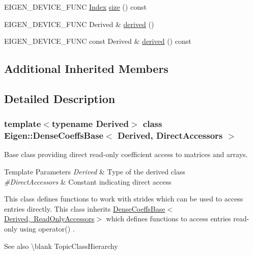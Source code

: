 \begin{DoxyCompactItemize}
\item 
E\+I\+G\+E\+N\+\_\+\+D\+E\+V\+I\+C\+E\+\_\+\+F\+U\+NC \mbox{\hyperlink{struct_eigen_1_1_eigen_base_a554f30542cc2316add4b1ea0a492ff02}{Index}} \mbox{\hyperlink{class_eigen_1_1_dense_coeffs_base_3_01_derived_00_01_direct_accessors_01_4_ac2c9348df3bb9c0044dbae6c278a8977}{size}} () const
\item 
E\+I\+G\+E\+N\+\_\+\+D\+E\+V\+I\+C\+E\+\_\+\+F\+U\+NC Derived \& \mbox{\hyperlink{class_eigen_1_1_dense_coeffs_base_3_01_derived_00_01_direct_accessors_01_4_a324b16961a11d2ecfd2d1b7dd7946545}{derived}} ()
\item 
E\+I\+G\+E\+N\+\_\+\+D\+E\+V\+I\+C\+E\+\_\+\+F\+U\+NC const Derived \& \mbox{\hyperlink{class_eigen_1_1_dense_coeffs_base_3_01_derived_00_01_direct_accessors_01_4_ad0cbee5e2dfef3bbe9db5e6d5fe12cc0}{derived}} () const
\end{DoxyCompactItemize}
\subsection*{Additional Inherited Members}


\subsection{Detailed Description}
\subsubsection*{template$<$typename Derived$>$\newline
class Eigen\+::\+Dense\+Coeffs\+Base$<$ Derived, Direct\+Accessors $>$}

Base class providing direct read-\/only coefficient access to matrices and arrays. 


\begin{DoxyTemplParams}{Template Parameters}
{\em Derived} & Type of the derived class \\
\hline
{\em \#\+Direct\+Accessors} & Constant indicating direct access\\
\hline
\end{DoxyTemplParams}
This class defines functions to work with strides which can be used to access entries directly. This class inherits \mbox{\hyperlink{class_eigen_1_1_dense_coeffs_base_3_01_derived_00_01_read_only_accessors_01_4}{Dense\+Coeffs\+Base$<$\+Derived, Read\+Only\+Accessors$>$}} which defines functions to access entries read-\/only using {\ttfamily operator()} .

\begin{DoxySeeAlso}{See also}
\textbackslash{}blank Topic\+Class\+Hierarchy 
\end{DoxySeeAlso}


